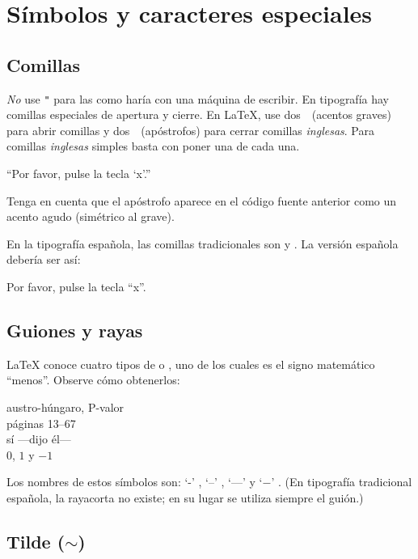\section{Símbolos y caracteres especiales}
 
\subsection{Comillas}

\emph{No} use \verb|"| para las   como haría con una máquina de escribir.  En tipografía hay comillas especiales de apertura y cierre.  En \LaTeX{}, use dos~\textasciigrave~(acentos graves) para abrir comillas y dos~\textquotesingle~(apóstrofos) para cerrar comillas \emph{inglesas}.  Para comillas \emph{inglesas} simples basta con poner una de cada una.
\begin{example}
``Por favor, pulse la tecla `x'.''
\end{example}
Tenga en cuenta que el apóstrofo aparece en el código fuente anterior como un acento agudo (simétrico al grave).

En la tipografía española, las comillas tradicionales son \guillemotleft{} y \guillemotright{}.  La versión española debería ser así:
\begin{example}
\guillemotleft
Por favor, pulse la tecla ``x''.%
\guillemotright
\end{example}

\subsection{Guiones y rayas}

\LaTeX{} conoce cuatro tipos de  o , uno de los cuales es el signo matemático ``menos''.  Observe cómo obtenerlos: \index{-} \index{--} \index{---}  

\begin{example}
austro-húngaro, P-valor\\
páginas 13--67\\
sí ---dijo él--- \\
$0$, $1$ y $-1$
\end{example}
Los nombres de estos símbolos son: 
`-' , `--' , `---'  y `$-$' .  (En tipografía tradicional española, la rayacorta no existe; en su lugar se utiliza siempre el guión.)

\subsection[Tilde]{Tilde ($\sim$)}

